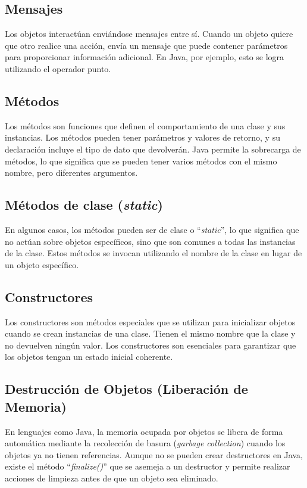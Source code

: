 \documentclass[11pt, twocolumn]{article}
\begin{document}
  \subsection*{Mensajes}
  Los objetos interactúan enviándose mensajes entre sí. Cuando un objeto quiere que otro realice una acción, envía un mensaje que puede contener parámetros para proporcionar información adicional. En Java, por ejemplo, esto se logra utilizando el operador punto.

  \subsection*{Métodos}
  Los métodos son funciones que definen el comportamiento de una clase y sus instancias. Los métodos pueden tener parámetros y valores de retorno, y su declaración incluye el tipo de dato que devolverán. Java permite la sobrecarga de métodos, lo que significa que se pueden tener varios métodos con el mismo nombre, pero diferentes argumentos.

  \subsection*{Métodos de clase (\textit{static})}
  En algunos casos, los métodos pueden ser de clase o ``\textit{static}'', lo que significa que no actúan sobre objetos específicos, sino que son comunes a todas las instancias de la clase. Estos métodos se invocan utilizando el nombre de la clase en lugar de un objeto específico.

  \subsection*{Constructores}
  Los constructores son métodos especiales que se utilizan para inicializar objetos cuando se crean instancias de una clase. Tienen el mismo nombre que la clase y no devuelven ningún valor. Los constructores son esenciales para garantizar que los objetos tengan un estado inicial coherente.

  \subsection*{Destrucción de Objetos (Liberación de Memoria)}
  En lenguajes como Java, la memoria ocupada por objetos se libera de forma automática mediante la recolección de basura (\textit{garbage collection}) cuando los objetos ya no tienen referencias. Aunque no se pueden crear destructores en Java, existe el método ``\textit{finalize()}'' que se asemeja a un destructor y permite realizar acciones de limpieza antes de que un objeto sea eliminado.
\end{document}

